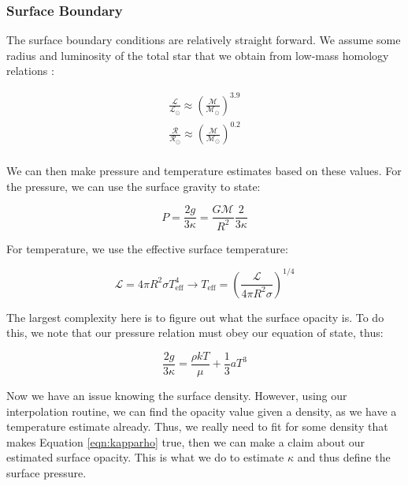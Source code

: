 \documentclass[twocolumn]{aastex631}
\begin{document}
\subsubsection{Surface Boundary}

The surface boundary conditions are relatively straight forward. We assume some radius and luminosity of the total star that we obtain from low-mass homology relations \citep{stelint}:

\begin{equation}
\boxed{
\begin{array}{lcl}
\frac{\mathcal{L}}{\mathcal{L}_\odot} \approx \left(\frac{\mathcal{M}}{\mathcal{M}_\odot}\right)^{3.9} \\
\frac{\mathcal{R}}{\mathcal{R}_\odot} \approx \left(\frac{\mathcal{M}}{\mathcal{M}_\odot}\right)^{0.2} \\
\end{array}
}
\end{equation}

We can then make pressure and temperature estimates based on these values. For the pressure, we can use the surface gravity to state:

\begin{equation}
	P = \frac{2g}{3\kappa} = \frac{G\mathcal{M}}{R^2} \frac{2}{3\kappa}
\end{equation}

For temperature, we use the effective surface temperature:

\begin{equation}
	\mathcal{L} = 4\pi R^2 \sigma T_{\text{eff}}^4 \rightarrow T_\text{eff} = \left(\frac{\mathcal{L}}{4\pi R^2 \sigma}\right)^{1/4}
\end{equation}

The largest complexity here is to figure out what the surface opacity is. To do this, we note that our pressure relation must obey our equation of state, thus:

\begin{equation}
	\label{eqn:kapparho}
	\frac{2g}{3\kappa} = \frac{\rho k T}{\mu} + \frac{1}{3}aT^3
\end{equation}

Now we have an issue knowing the surface density. However, using our interpolation routine, we can find the opacity value given a density, as we have a temperature estimate already. Thus, we really need to fit for some density that makes Equation \ref{eqn:kapparho} true, then we can make a claim about our estimated surface opacity. This is what we do to estimate $\kappa$ and thus define the surface pressure.
\end{document}
